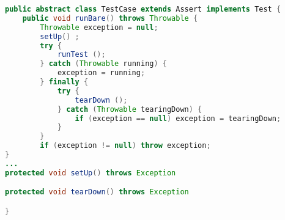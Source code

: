 \begin{lstlisting}[language=Java, caption=JUnit Case Study Example, label=lst:junit_case_study]
public abstract class TestCase extends Assert implements Test {
	public void runBare() throws Throwable {
		Throwable exception = null;
		setUp() ;
		try {
			runTest ();
		} catch (Throwable running) {
			exception = running;
		} finally {
			try {
				tearDown ();
			} catch (Throwable tearingDown) {
				if (exception == null) exception = tearingDown;
			}
		}
		if (exception != null) throw exception;
}
...
protected void setUp() throws Exception

protected void tearDown() throws Exception

}
\end{lstlisting}


































